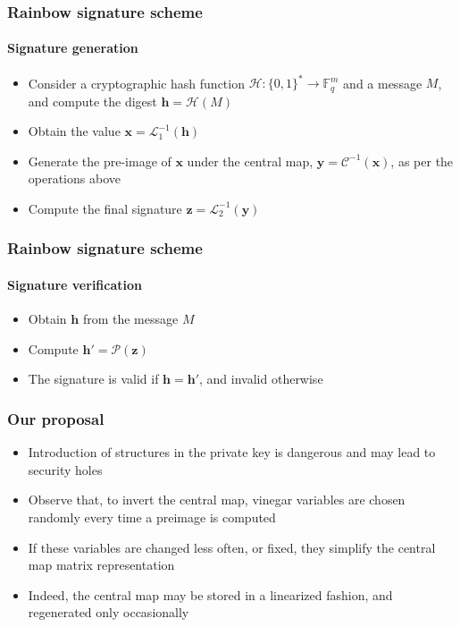 \documentclass[12pt]{beamer}
\begin{document}
\begin{frame}
\begin{itemize}
\begin{figure}
    \end{figure}
  \end{itemize}
\end{frame}

\begin{frame}
  \frametitle{Rainbow signature scheme}
  \framesubtitle{Signature generation}
  \begin{itemize}
    \item Consider a cryptographic hash function
        $\mathcal{H} : \{0, 1\}^{*} \to \mathbb{F}_{q}^{m}$ and a message $M$,
          and compute the digest $\mathbf{h} = \mathcal{H}(M)$
    \item Obtain the value $\mathbf{x} = \mathcal{L}_{1}^{-1}(\mathbf{h})$
    \item Generate the pre-image of $\mathbf{x}$ under the central map,
        $\mathbf{y} = \mathcal{C}^{-1}(\mathbf{x})$, as per the operations
          above
    \item Compute the final signature
        $\mathbf{z} = \mathcal{L}_{2}^{-1}(\mathbf{y})$
  \end{itemize}
\end{frame}

\begin{frame}
  \frametitle{Rainbow signature scheme}
  \framesubtitle{Signature verification}
  \begin{itemize}
    \item Obtain $\mathbf{h}$ from the message $M$
    \item Compute $\mathbf{h}' = \mathcal{P}(\mathbf{z})$
    \item The signature is valid if $\mathbf{h} = \mathbf{h}'$, and invalid
        otherwise
  \end{itemize}
\end{frame}

\begin{frame}
  \frametitle{Our proposal}
  \begin{itemize}
    \item Introduction of structures in the private key is dangerous and may
        lead to security holes
    \item Observe that, to invert the central map, vinegar variables are
        chosen randomly every time a preimage is computed
    \item If these variables are changed less often, or fixed, they simplify
        the central map matrix representation
    \item Indeed, the central map may be stored in a linearized fashion, and
        regenerated only occasionally
  \end{itemize}
\end{frame}
\end{document}
